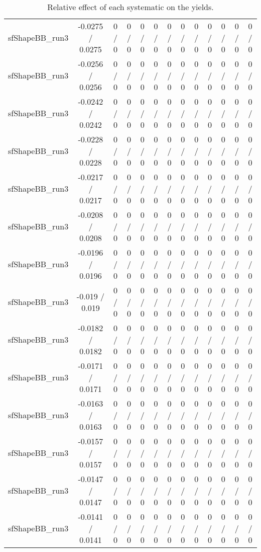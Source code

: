 \documentclass[10pt]{article}
\begin{document}
\begin{table}[htbp]
\begin{center}
\begin{tabular}{|c|c|c|c|c|c|c|c|c|c|c|c|c|}
  sfShapeBB_run3 & -0.0275 / 0.0275 & 0 / 0 & 0 / 0 & 0 / 0 & 0 / 0 & 0 / 0 & 0 / 0 & 0 / 0 & 0 / 0 & 0 / 0 & 0 / 0 & 0 / 0 \\ 
  sfShapeBB_run3 & -0.0256 / 0.0256 & 0 / 0 & 0 / 0 & 0 / 0 & 0 / 0 & 0 / 0 & 0 / 0 & 0 / 0 & 0 / 0 & 0 / 0 & 0 / 0 & 0 / 0 \\ 
  sfShapeBB_run3 & -0.0242 / 0.0242 & 0 / 0 & 0 / 0 & 0 / 0 & 0 / 0 & 0 / 0 & 0 / 0 & 0 / 0 & 0 / 0 & 0 / 0 & 0 / 0 & 0 / 0 \\ 
  sfShapeBB_run3 & -0.0228 / 0.0228 & 0 / 0 & 0 / 0 & 0 / 0 & 0 / 0 & 0 / 0 & 0 / 0 & 0 / 0 & 0 / 0 & 0 / 0 & 0 / 0 & 0 / 0 \\ 
  sfShapeBB_run3 & -0.0217 / 0.0217 & 0 / 0 & 0 / 0 & 0 / 0 & 0 / 0 & 0 / 0 & 0 / 0 & 0 / 0 & 0 / 0 & 0 / 0 & 0 / 0 & 0 / 0 \\ 
  sfShapeBB_run3 & -0.0208 / 0.0208 & 0 / 0 & 0 / 0 & 0 / 0 & 0 / 0 & 0 / 0 & 0 / 0 & 0 / 0 & 0 / 0 & 0 / 0 & 0 / 0 & 0 / 0 \\ 
  sfShapeBB_run3 & -0.0196 / 0.0196 & 0 / 0 & 0 / 0 & 0 / 0 & 0 / 0 & 0 / 0 & 0 / 0 & 0 / 0 & 0 / 0 & 0 / 0 & 0 / 0 & 0 / 0 \\ 
  sfShapeBB_run3 & -0.019 / 0.019 & 0 / 0 & 0 / 0 & 0 / 0 & 0 / 0 & 0 / 0 & 0 / 0 & 0 / 0 & 0 / 0 & 0 / 0 & 0 / 0 & 0 / 0 \\ 
  sfShapeBB_run3 & -0.0182 / 0.0182 & 0 / 0 & 0 / 0 & 0 / 0 & 0 / 0 & 0 / 0 & 0 / 0 & 0 / 0 & 0 / 0 & 0 / 0 & 0 / 0 & 0 / 0 \\ 
  sfShapeBB_run3 & -0.0171 / 0.0171 & 0 / 0 & 0 / 0 & 0 / 0 & 0 / 0 & 0 / 0 & 0 / 0 & 0 / 0 & 0 / 0 & 0 / 0 & 0 / 0 & 0 / 0 \\ 
  sfShapeBB_run3 & -0.0163 / 0.0163 & 0 / 0 & 0 / 0 & 0 / 0 & 0 / 0 & 0 / 0 & 0 / 0 & 0 / 0 & 0 / 0 & 0 / 0 & 0 / 0 & 0 / 0 \\ 
  sfShapeBB_run3 & -0.0157 / 0.0157 & 0 / 0 & 0 / 0 & 0 / 0 & 0 / 0 & 0 / 0 & 0 / 0 & 0 / 0 & 0 / 0 & 0 / 0 & 0 / 0 & 0 / 0 \\ 
  sfShapeBB_run3 & -0.0147 / 0.0147 & 0 / 0 & 0 / 0 & 0 / 0 & 0 / 0 & 0 / 0 & 0 / 0 & 0 / 0 & 0 / 0 & 0 / 0 & 0 / 0 & 0 / 0 \\ 
  sfShapeBB_run3 & -0.0141 / 0.0141 & 0 / 0 & 0 / 0 & 0 / 0 & 0 / 0 & 0 / 0 & 0 / 0 & 0 / 0 & 0 / 0 & 0 / 0 & 0 / 0 & 0 / 0 \\ 
\hline 
\end{tabular} 
\caption{Relative effect of each systematic on the yields.} 
\end{center} 
\end{table} 
\end{document}
